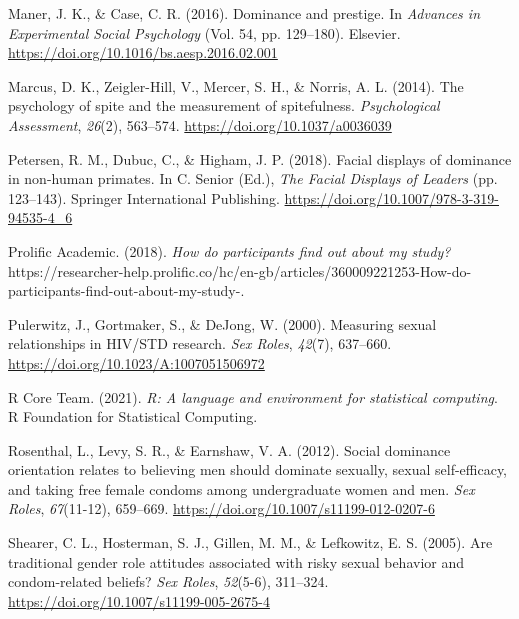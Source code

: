 \documentclass[
  donotrepeattitle,doc, 12pt, a4paper,floatsintext]{apa7}
\newlength{\cslhangindent}
\newlength{\cslentryspacingunit} %
\newenvironment{CSLReferences}[2] %
 {%
  \setlength{\parindent}{0pt}
  \ifodd #1
  \let\oldpar\par
  \def\par{\hangindent=\cslhangindent\oldpar}
  \fi
  \setlength{\parskip}{#2\cslentryspacingunit}
 }%
 {}
\begin{document}
\begin{CSLReferences}{1}{0}
\leavevmode{}%
Maner, J. K., \& Case, C. R. (2016). Dominance and prestige. In \emph{Advances in {Experimental Social Psychology}} (Vol. 54, pp. 129--180). {Elsevier}. \url{https://doi.org/10.1016/bs.aesp.2016.02.001}

\leavevmode{}%
Marcus, D. K., Zeigler-Hill, V., Mercer, S. H., \& Norris, A. L. (2014). The psychology of spite and the measurement of spitefulness. \emph{Psychological Assessment}, \emph{26}(2), 563--574. \url{https://doi.org/10.1037/a0036039}

\leavevmode{}%
Petersen, R. M., Dubuc, C., \& Higham, J. P. (2018). Facial displays of dominance in non-human primates. In C. Senior (Ed.), \emph{The {Facial Displays} of {Leaders}} (pp. 123--143). {Springer International Publishing}. \url{https://doi.org/10.1007/978-3-319-94535-4_6}

\leavevmode{}%
Prolific Academic. (2018). \emph{How do participants find out about my study?} https://researcher-help.prolific.co/hc/en-gb/articles/360009221253-How-do-participants-find-out-about-my-study-.

\leavevmode{}%
Pulerwitz, J., Gortmaker, S., \& DeJong, W. (2000). Measuring sexual relationships in {HIV}/{STD} research. \emph{Sex Roles}, \emph{42}(7), 637--660. \url{https://doi.org/10.1023/A:1007051506972}

\leavevmode{}%
R Core Team. (2021). \emph{R: {A} language and environment for statistical computing}. R Foundation for Statistical Computing.

\leavevmode{}%
Rosenthal, L., Levy, S. R., \& Earnshaw, V. A. (2012). Social dominance orientation relates to believing men should dominate sexually, sexual self-efficacy, and taking free female condoms among undergraduate women and men. \emph{Sex Roles}, \emph{67}(11-12), 659--669. \url{https://doi.org/10.1007/s11199-012-0207-6}

\leavevmode{}%
Shearer, C. L., Hosterman, S. J., Gillen, M. M., \& Lefkowitz, E. S. (2005). Are traditional gender role attitudes associated with risky sexual behavior and condom-related beliefs? \emph{Sex Roles}, \emph{52}(5-6), 311--324. \url{https://doi.org/10.1007/s11199-005-2675-4}


\end{CSLReferences}
\end{document}
